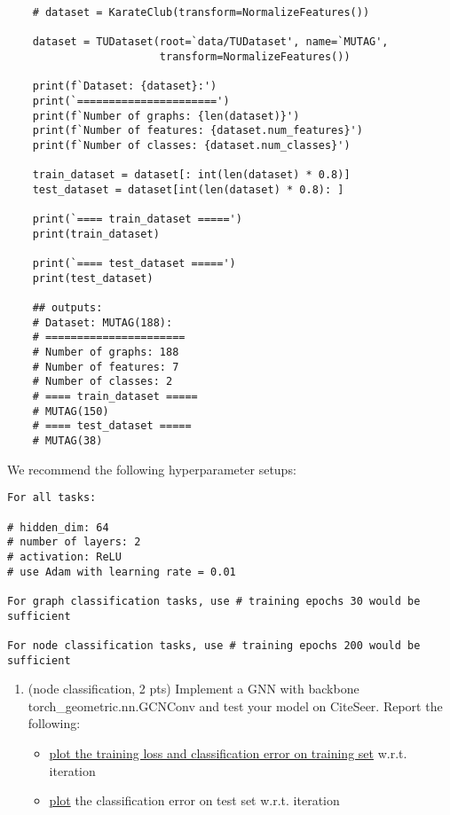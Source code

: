 \documentclass[10pt]{article}
\newcommand{\wrt}{{w.r.t.}\xspace}
\begin{document}
\begin{exercise}
\begin{itemize}
\begin{verbatim}
    # dataset = KarateClub(transform=NormalizeFeatures())

    dataset = TUDataset(root=`data/TUDataset', name=`MUTAG',
                        transform=NormalizeFeatures())

    print(f`Dataset: {dataset}:')
    print(`======================')
    print(f`Number of graphs: {len(dataset)}')
    print(f`Number of features: {dataset.num_features}')
    print(f`Number of classes: {dataset.num_classes}')

    train_dataset = dataset[: int(len(dataset) * 0.8)]
    test_dataset = dataset[int(len(dataset) * 0.8): ]

    print(`==== train_dataset =====')
    print(train_dataset)

    print(`==== test_dataset =====')
    print(test_dataset)
            
    ## outputs:
    # Dataset: MUTAG(188):
    # ======================
    # Number of graphs: 188
    # Number of features: 7
    # Number of classes: 2
    # ==== train_dataset =====
    # MUTAG(150)
    # ==== test_dataset =====
    # MUTAG(38)
            \end{verbatim}
    \end{itemize}

    We recommend the following hyperparameter setups: 
    \begin{verbatim}
For all tasks: 

# hidden_dim: 64
# number of layers: 2
# activation: ReLU
# use Adam with learning rate = 0.01

For graph classification tasks, use # training epochs 30 would be sufficient 

For node classification tasks, use # training epochs 200 would be sufficient
    \end{verbatim}
    
		\begin{enumerate}
		    \item (node classification, 2 pts)
                Implement a GNN with backbone \textsf{torch\_geometric.nn.GCNConv} and test your model on CiteSeer. Report the following: 
                \begin{itemize}
                    \item \uline{plot the training loss and  classification error on training set} \wrt iteration 
                    
                    \item \uline{plot} the classification error on test set \wrt iteration
                    

\end{itemize}
\end{enumerate}
\end{exercise}
\end{document}
